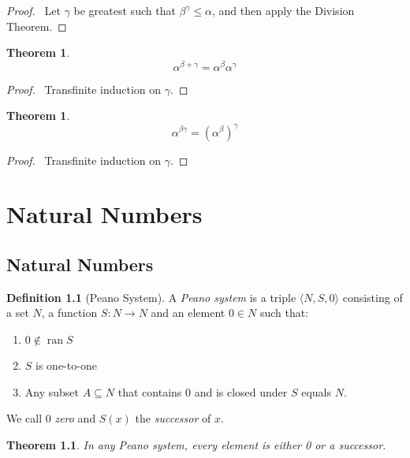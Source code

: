 \documentclass{report}
\let\qed\relax
\newtheorem{theorem}[axiom]{Theorem}
\theoremstyle{definition}
\newtheorem{definition}[axiom]{Definition}
\newcommand{\ran}{\ensuremath{\operatorname{ran}}}
\begin{document}
    \begin{proof}
        \pf\ Let $\gamma$ be greatest such that $\beta^\gamma \leq \alpha$, and then apply the Division Theorem. \qed
    \end{proof}
    
    \begin{theorem}
        \[ \alpha^{\beta + \gamma} = \alpha^\beta \alpha^\gamma \]
    \end{theorem}

    \begin{proof}
        \pf\ Transfinite induction on $\gamma$. \qed
    \end{proof}

    \begin{theorem}
        \[ \alpha^{\beta \gamma} = (\alpha^\beta)^\gamma \]
    \end{theorem}

    \begin{proof}
        \pf\ Transfinite induction on $\gamma$. \qed
    \end{proof}

    \chapter{Natural Numbers}

    \section{Natural Numbers}

    \begin{definition}[Peano System]
        A \emph{Peano system} is a triple $\langle N, S, 0 \rangle$ consisting of a set $N$,
        a function $S : N \rightarrow N$ and an element $0 \in N$ such that:
        \begin{enumerate}
            \item $0 \notin \ran S$
            \item $S$ is one-to-one
            \item Any subset $A \subseteq N$ that contains $0$ and is closed under $S$ equals $N$.
        \end{enumerate}
        We call 0 \emph{zero} and $S(x)$ the \emph{successor} of $x$.
    \end{definition}

    \begin{theorem}
        In any Peano system, every element is either 0 or a successor.
    \end{theorem}
\end{document}
